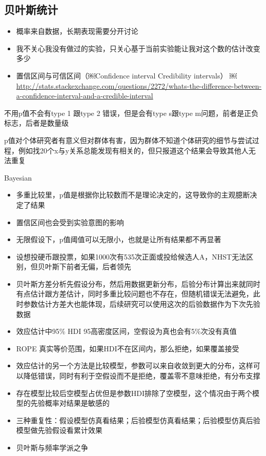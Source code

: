 \documentclass[]{tufte-book}
\providecommand{\tightlist}{%
  \setlength{\itemsep}{0pt}\setlength{\parskip}{0pt}}
\begin{document}
\hypertarget{ux8d1dux53f6ux65afux7edfux8ba1}{%
\subsection{贝叶斯统计}\label{ux8d1dux53f6ux65afux7edfux8ba1}}

\begin{itemize}
\tightlist
\item
  概率来自数据，长期表现需要分开讨论
\item
  我不关心我没有做过的实验，只关心基于当前实验能让我对这个数的估计改变多少
\item
  置信区间与可信区间（￼Confidence interval Credibility intervals）
  ￼
  \url{http://stats.stackexchange.com/questions/2272/whats-the-difference-between-a-confidence-interval-and-a-credible-interval}
\end{itemize}

不用p值不会有type 1 跟type 2 错误，但是会有type s跟type m问题，前者是正负标志，后者是数量级

p值对个体研究者有意义但对群体有害，因为群体不知道个体研究的细节与尝试过程，例如找20个x与y关系总能发现有相关的，但只报道这个结果会导致其他人无法重复

Bayesian

\begin{itemize}
\item
  多重比较里，p值是根据你比较数而不是理论决定的，这导致你的主观臆断决定了结果
\item
  置信区间也会受到实验意图的影响
\item
  无限假设下，p值阈值可以无限小，也就是让所有结果都不再显著
\item
  设想投硬币跟投票，如果1000次有535次正面或投给候选人A，NHST无法区别，但贝叶斯下前者无偏，后者领先
\item
  贝叶斯方差分析先假设分布，然后用数据更新分布，后验分布计算出来就同时有点估计跟方差估计，同时多重比较问题也不存在，但随机错误无法避免，此时参数估计方差大也能体现，后续研究可以使用这次的后验数据作为下次先验数据
\item
  效应估计中95\% HDI 95高密度区间，空假设为真也会有5\%次没有真值
\item
  ROPE 真实等价范围，如果HDI不在区间内，那么拒绝，如果覆盖接受
\item
  效应估计的另一个方法是比较模型，参数可以来自收敛到更大的分布，这样可以降低错误，同时有利于空假设而不是拒绝，覆盖零不意味拒绝，有分布支撑
\item
  存在模型比较后空模型占优但是参数HDI排除了空模型，这个情况由于两个模型的先验概率对结果是敏感的
\item
  三种重复性：假设模型仿真看结果；后验模型仿真看结果；后验模型仿真后验模型做先验假设看累计效果
\item
  贝叶斯与频率学派之争
\end{itemize}
\end{document}

